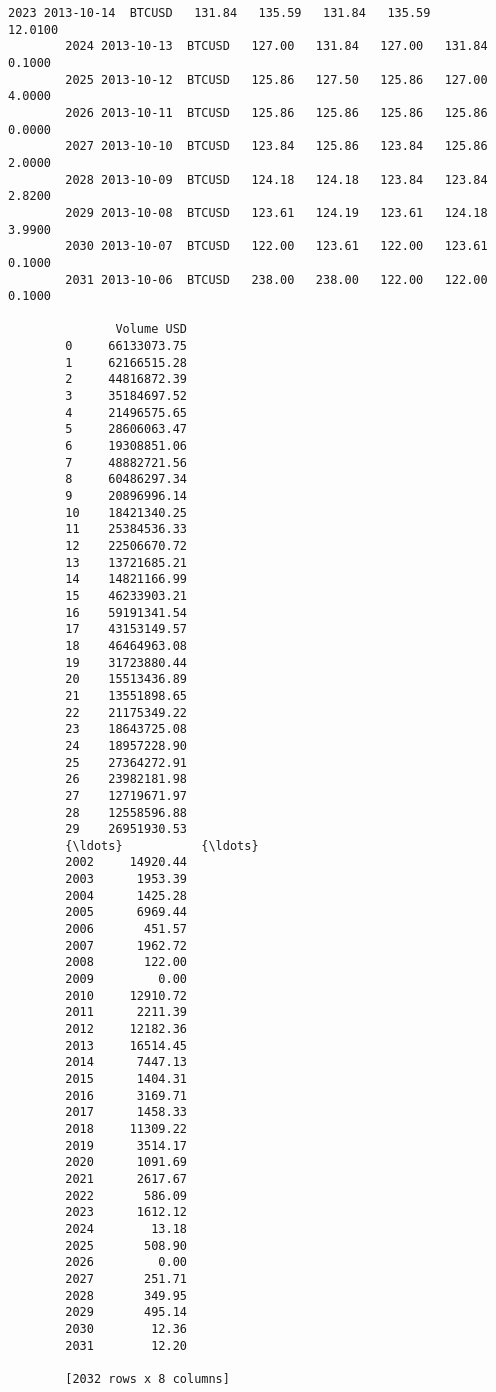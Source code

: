 \documentclass[11pt]{article}
\begin{document}
\begin{Verbatim}[commandchars=\\\{\}]
        2023 2013-10-14  BTCUSD   131.84   135.59   131.84   135.59     12.0100   
        2024 2013-10-13  BTCUSD   127.00   131.84   127.00   131.84      0.1000   
        2025 2013-10-12  BTCUSD   125.86   127.50   125.86   127.00      4.0000   
        2026 2013-10-11  BTCUSD   125.86   125.86   125.86   125.86      0.0000   
        2027 2013-10-10  BTCUSD   123.84   125.86   123.84   125.86      2.0000   
        2028 2013-10-09  BTCUSD   124.18   124.18   123.84   123.84      2.8200   
        2029 2013-10-08  BTCUSD   123.61   124.19   123.61   124.18      3.9900   
        2030 2013-10-07  BTCUSD   122.00   123.61   122.00   123.61      0.1000   
        2031 2013-10-06  BTCUSD   238.00   238.00   122.00   122.00      0.1000   
        
               Volume USD  
        0     66133073.75  
        1     62166515.28  
        2     44816872.39  
        3     35184697.52  
        4     21496575.65  
        5     28606063.47  
        6     19308851.06  
        7     48882721.56  
        8     60486297.34  
        9     20896996.14  
        10    18421340.25  
        11    25384536.33  
        12    22506670.72  
        13    13721685.21  
        14    14821166.99  
        15    46233903.21  
        16    59191341.54  
        17    43153149.57  
        18    46464963.08  
        19    31723880.44  
        20    15513436.89  
        21    13551898.65  
        22    21175349.22  
        23    18643725.08  
        24    18957228.90  
        25    27364272.91  
        26    23982181.98  
        27    12719671.97  
        28    12558596.88  
        29    26951930.53  
        {\ldots}           {\ldots}  
        2002     14920.44  
        2003      1953.39  
        2004      1425.28  
        2005      6969.44  
        2006       451.57  
        2007      1962.72  
        2008       122.00  
        2009         0.00  
        2010     12910.72  
        2011      2211.39  
        2012     12182.36  
        2013     16514.45  
        2014      7447.13  
        2015      1404.31  
        2016      3169.71  
        2017      1458.33  
        2018     11309.22  
        2019      3514.17  
        2020      1091.69  
        2021      2617.67  
        2022       586.09  
        2023      1612.12  
        2024        13.18  
        2025       508.90  
        2026         0.00  
        2027       251.71  
        2028       349.95  
        2029       495.14  
        2030        12.36  
        2031        12.20  
        
        [2032 rows x 8 columns]
\end{Verbatim}
            
\end{document}
